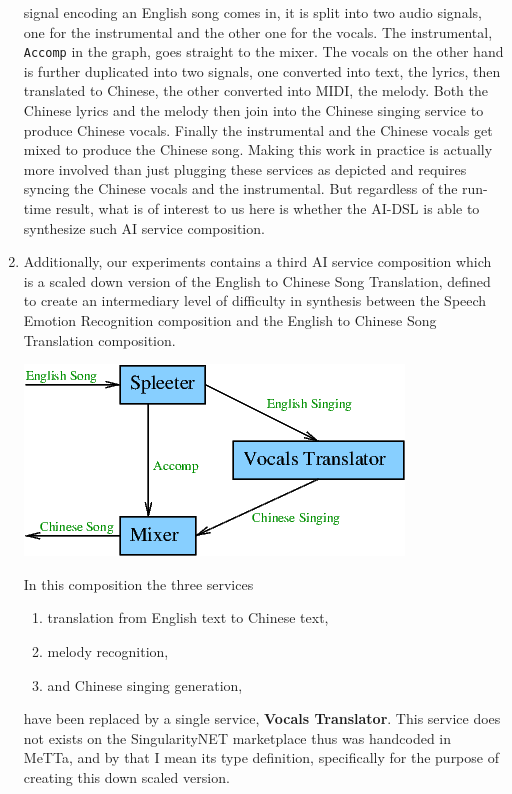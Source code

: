 \documentclass[]{report}
\begin{document}
\begin{enumerate}
  signal encoding an English song comes in, it is split into two audio
  signals, one for the instrumental and the other one for the vocals.
  The instrumental, \texttt{Accomp} in the graph, goes straight to the
  mixer.  The vocals on the other hand is further duplicated into two
  signals, one converted into text, the lyrics, then translated to
  Chinese, the other converted into MIDI, the melody.  Both the
  Chinese lyrics and the melody then join into the Chinese singing
  service to produce Chinese vocals.  Finally the instrumental and the
  Chinese vocals get mixed to produce the Chinese song.  Making this
  work in practice is actually more involved than just plugging these
  services as depicted and requires syncing the Chinese vocals and the
  instrumental.  But regardless of the run-time result, what is of
  interest to us here is whether the AI-DSL is able to synthesize such
  AI service composition.
\item Additionally, our experiments contains a third AI service
  composition which is a scaled down version of the English to Chinese
  Song Translation, defined to create an intermediary level of
  difficulty in synthesis between the Speech Emotion Recognition
  composition and the English to Chinese Song Translation composition.
  \begin{center}
    \includegraphics[scale=0.6]{figs/EnglishToChineseSongScaledDown.png}
  \end{center}
  In this composition the three services
  \begin{enumerate}
  \item translation from English text to Chinese text,
  \item melody recognition,
  \item and Chinese singing generation,
  \end{enumerate}
  have been replaced by a single service, \textbf{Vocals Translator}.
  This service does not exists on the SingularityNET marketplace thus
  was handcoded in MeTTa, and by that I mean its type definition,
  specifically for the purpose of creating this down scaled version.
\end{enumerate}
\end{document}
